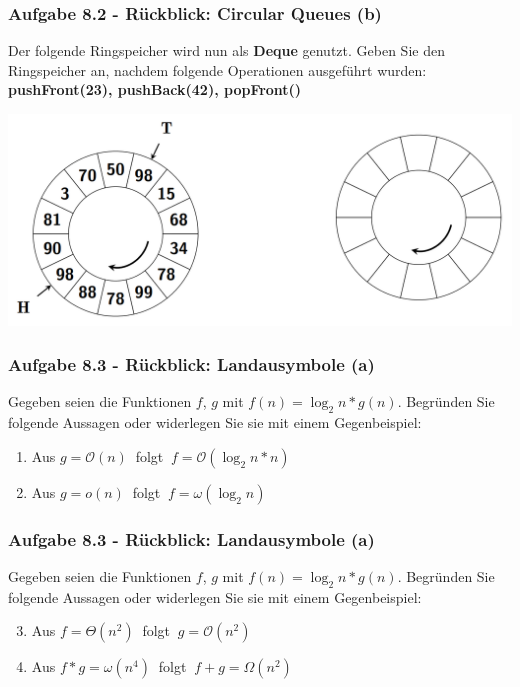 \documentclass{beamer}
\begin{document}
\begin{frame}[t]
	\frametitle{Aufgabe 8.2 - Rückblick: Circular Queues (b)}
	{\small
		Der folgende Ringspeicher wird nun als \textbf{Deque} genutzt. Geben Sie den Ringspeicher
		an, nachdem folgende Operationen ausgeführt wurden: \textbf{pushFront(23), pushBack(42),
			popFront()}
	}

	\medskip

	\includegraphics[width=\textwidth]{images/circular_queue_b.png}
\end{frame}

\begin{frame}[t]
	\frametitle{Aufgabe 8.3 - Rückblick: Landausymbole (a)}
	Gegeben seien die Funktionen $f$, $g$ mit $f(n) = \log_2{n} \ast g(n)$. Begründen Sie folgende
	Aussagen oder widerlegen Sie sie mit einem Gegenbeispiel:

	\begin{enumerate}
		\setlength{\itemsep}{6em}
		\item Aus $g = \mathcal{O}(n)\ $ folgt $\ f = \mathcal{O}(\log_2{n} \ast n)$ \\
		\item Aus $g = o(n)\ $ folgt $\ f = \omega(\log_2{n})$
	\end{enumerate}
\end{frame}

\begin{frame}[t]
	\frametitle{Aufgabe 8.3 - Rückblick: Landausymbole (a)}
	Gegeben seien die Funktionen $f$, $g$ mit $f(n) = \log_2{n} \ast g(n)$. Begründen Sie folgende
	Aussagen oder widerlegen Sie sie mit einem Gegenbeispiel:

	\begin{enumerate}
		\setcounter{enumi}{2}
		\setlength{\itemsep}{6em}
		\item Aus $f = \Theta(n^2)\ $ folgt $\ g = \mathcal{O}(n^2)$ \\
		\item Aus $f \ast g = \omega(n^4)\ $ folgt $\ f + g = \Omega(n^2)$
	\end{enumerate}
\end{frame}
\end{document}
